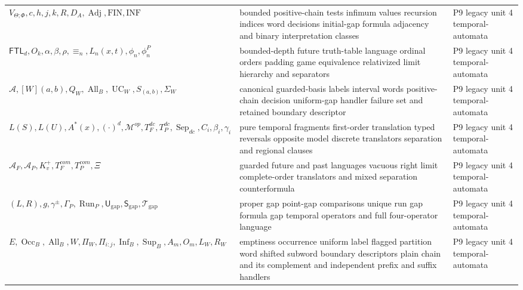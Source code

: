 \begin{longtable}{@{}p{}p{}p{}@{}}
\(V_{\Theta;\Phi},\allowbreak c,\allowbreak h,\allowbreak j,\allowbreak k,\allowbreak R,\allowbreak D_A,\allowbreak \operatorname{Adj},\allowbreak \mathrm{FIN},\allowbreak \mathrm{INF}\) & bounded positive-chain tests infimum values recursion indices word decisions initial-gap formula adjacency and binary interpretation classes & P9 legacy unit 4 temporal-\allowbreak{}automata \\
\(\mathsf{FTL}_d,\allowbreak O_k,\allowbreak \alpha,\allowbreak \beta,\allowbreak \rho,\allowbreak \equiv_n,\allowbreak L_n(x,\allowbreak t),\allowbreak \phi_n,\allowbreak \phi_n^P\) & bounded-depth future truth-table language ordinal orders padding game equivalence relativized limit hierarchy and separators & P9 legacy unit 4 temporal-\allowbreak{}automata \\
\(\mathcal A,\allowbreak [W](a,\allowbreak b),\allowbreak Q_W,\allowbreak \operatorname{All}_B,\allowbreak \operatorname{UC}_W,\allowbreak S_{(a,b)},\allowbreak \Sigma_W\) & canonical guarded-basis labels interval words positive-chain decision uniform-gap handler failure set and retained boundary descriptor & P9 legacy unit 4 temporal-\allowbreak{}automata \\
\(L(S),\allowbreak L(U),\allowbreak A^*(x),\allowbreak (\cdot)^d,\allowbreak \mathcal M^{op},\allowbreak T_F^{dc},\allowbreak T_P^{dc},\allowbreak \operatorname{Sep}_{dc},\allowbreak C_i,\allowbreak \beta_i,\allowbreak \gamma_i\) & pure temporal fragments first-order translation typed reversals opposite model discrete translators separation and regional clauses & P9 legacy unit 4 temporal-\allowbreak{}automata \\
\(\mathcal A_F,\allowbreak \mathcal A_P,\allowbreak K_v^+,\allowbreak T_F^{com},\allowbreak T_P^{com},\allowbreak \Xi\) & guarded future and past languages vacuous right limit complete-order translators and mixed separation counterformula & P9 legacy unit 4 temporal-\allowbreak{}automata \\
\((L,\allowbreak R),\allowbreak g,\allowbreak \gamma^\pm,\allowbreak \Gamma_P,\allowbreak \operatorname{Run}_P,\allowbreak \mathsf U_{\mathrm{gap}},\allowbreak \mathsf S_{\mathrm{gap}},\allowbreak \mathcal T_{\mathrm{gap}}\) & proper gap point-gap comparisons unique run gap formula gap temporal operators and full four-operator language & P9 legacy unit 4 temporal-\allowbreak{}automata \\
\(E,\allowbreak \operatorname{Occ}_B,\allowbreak \operatorname{All}_B,\allowbreak W,\allowbreak \Pi_W,\allowbreak \Pi_{i:j},\allowbreak \operatorname{Inf}_B,\allowbreak \operatorname{Sup}_B,\allowbreak A_m,\allowbreak O_m,\allowbreak L_W,\allowbreak R_W\) & emptiness occurrence uniform label flagged partition word shifted subword boundary descriptors plain chain and its complement and independent prefix and suffix handlers & P9 legacy unit 4 temporal-\allowbreak{}automata \\

\end{longtable}
